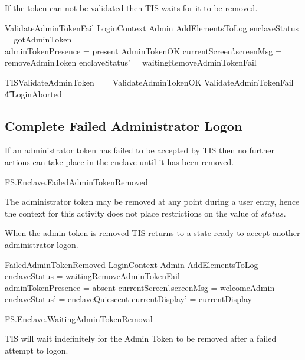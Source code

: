 If the token can not be validated then TIS waits for it to be removed.

\begin{schema}{ValidateAdminTokenFail}
        LoginContext
\also
        \Xi Admin
\also
        AddElementsToLog
\where
        enclaveStatus = gotAdminToken
\\      adminTokenPresence = present
\also
        \lnot AdminTokenOK
\also
        currentScreen'.screenMsg = removeAdminToken
\also
        enclaveStatus' = waitingRemoveAdminTokenFail
\end{schema}

\begin{zed}
        TISValidateAdminToken == ValidateAdminTokenOK \lor
        ValidateAdminTokenFail 
\\ \t4  \lor
        LoginAborted
\end{zed}

\subsection{Complete Failed Administrator Logon}

If an administrator token has failed to be accepted by TIS 
then no further actions can take place in the enclave until it has 
been removed.

\begin{traceunit}{FS.Enclave.FailedAdminTokenRemoved}
\end{traceunit}


The administrator token may be removed at any point during a user
entry, hence the context for this
activity does not place restrictions on the value of $status$.

When the admin token is removed TIS returns to a state ready
to accept another administrator logon.
\begin{schema}{FailedAdminTokenRemoved}
        LoginContext
\also
        \Xi Admin
\also 
        AddElementsToLog
\where
        enclaveStatus = waitingRemoveAdminTokenFail
\\      adminTokenPresence = absent
\also
        currentScreen'.screenMsg = welcomeAdmin
\also
        enclaveStatus' = enclaveQuiescent
\also
        currentDisplay' = currentDisplay
\end{schema}

\begin{traceunit}{FS.Enclave.WaitingAdminTokenRemoval}
\end{traceunit}


TIS will wait indefinitely for the Admin Token to be removed after a
failed attempt to logon.

